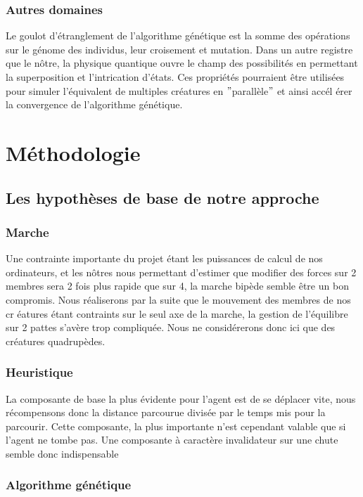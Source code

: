 \documentclass[journal, a4paper]{IEEEtran}
\begin{document}
\subsubsection{Autres domaines}
	Le goulot d'étranglement de l'algorithme génétique est la somme
	des opérations sur le génome des individus, leur croisement et
	mutation.
	Dans un autre registre que le nôtre, la physique quantique ouvre le
	champ des possibilités en permettant la superposition et
	l'intrication
	d'états.
	Ces propriétés pourraient être utilisées pour simuler
	l'équivalent de multiples créatures en \("\)parallèle\("\) et ainsi accél
	érer la convergence
	de l'algorithme génétique.\cite{quantum-computing}

\section{Méthodologie}\label{sec:met}
	\subsection{Les hypothèses de base de notre approche}\label{subsec:les-hypotheses-de-base-de-notre-approche}
	\subsubsection{Marche}
	Une contrainte importante du projet étant les puissances de calcul
	de nos ordinateurs, et les nôtres nous permettant d'estimer que
	modifier des forces sur 2 membres sera 2 fois plus rapide que sur 4,
	la marche bipède semble être un bon compromis.
	Nous réaliserons par la suite que le mouvement des membres de nos cr
	éatures
	étant contraints sur le seul axe de la marche, la gestion de
	l'équilibre sur 2 pattes s'avère trop compliquée.
	Nous ne considérerons donc ici que des créatures quadrupèdes.

	\subsubsection{Heuristique}
	La composante de base la plus évidente pour l'agent est de se
	déplacer vite, nous récompensons donc la distance parcourue
	divisée par le temps mis pour la parcourir. Cette composante,
	la plus importante n'est cependant valable que si l'agent ne tombe
	pas. Une composante à caractère invalidateur sur une chute semble
	donc indispensable

	\subsubsection{Algorithme génétique}
\end{document}
